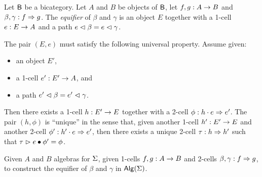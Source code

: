 \begin{definition}\label{def:equifier}
Let $\mathsf{B}$ be a bicategory. Let $A$ and $B$ be objects of $\mathsf{B}$, let $f,
g : A \rightarrow B$ and $\beta,\gamma : f \Rightarrow
g$. The \emph{equifier} of $\beta$ and $\gamma$ is an object $E$
together with a 1-cell $e : E \rightarrow A$ and a path
$e \vartriangleleft \beta = e \vartriangleleft \gamma$.

The pair $(E,e)$ must satisfy the following universal
property. Assume given:
\begin{itemize}
\item an object $E'$,
\item a 1-cell $e' : E' \rightarrow A$, and
\item a path $e' \vartriangleleft \beta = e' \vartriangleleft \gamma$.
\end{itemize}
Then there exists a 1-cell $h : E' \rightarrow E$ together with a 2-cell
$\phi : h \cdot e \Rightarrow e'$. The pair $(h,\phi)$ is ``unique'' in the sense that,
given another 1-cell $h' : E' \rightarrow E$ and another 2-cell $\phi' :
h' \cdot e \Rightarrow e'$, then there exists a unique 2-cell $\tau : h
\Rightarrow h'$ such that $\tau \vartriangleright e \bullet \phi' = \phi$.
\end{definition}

\begin{problem}
\label{prob:equifier}
Given $A$ and $B$ algebras for $\Sigma$, given 1-cells $f,g :
A \rightarrow B$ and 2-cells $\beta,\gamma : f \Rightarrow g$, to construct the
equifier of $\beta$ and $\gamma$ in $\mathsf{Alg}(\Sigma)$.
\end{problem}

